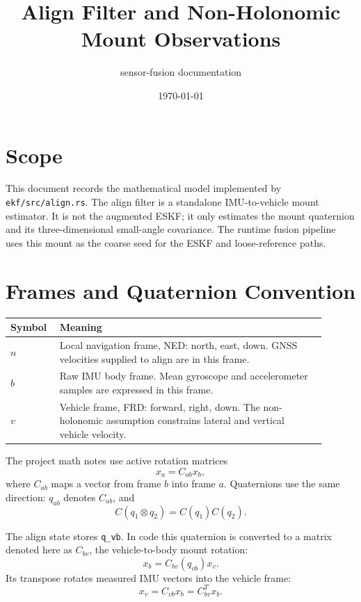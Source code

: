 \documentclass[11pt]{article}
\title{Align Filter and Non-Holonomic Mount Observations}
\author{sensor-fusion documentation}
\date{\today}
\newcommand{\T}{^{T}}
\begin{document}
\maketitle
\tableofcontents
\newpage

\section{Scope}

This document records the mathematical model implemented by
\texttt{ekf/src/align.rs}. The align filter is a standalone IMU-to-vehicle
mount estimator. It is not the augmented ESKF; it only estimates the mount
quaternion and its three-dimensional small-angle covariance. The runtime fusion
pipeline uses this mount as the coarse seed for the ESKF and loose-reference
paths.

\section{Frames and Quaternion Convention}

\begin{longtable}{>{\raggedright\arraybackslash}p{0.12\linewidth} >{\raggedright\arraybackslash}p{0.78\linewidth}}
\toprule
\textbf{Symbol} & \textbf{Meaning} \\
\midrule
\(n\) & Local navigation frame, NED: north, east, down. GNSS velocities supplied to align are in this frame. \\
\(b\) & Raw IMU body frame. Mean gyroscope and accelerometer samples are expressed in this frame. \\
\(v\) & Vehicle frame, FRD: forward, right, down. The non-holonomic assumption constrains lateral and vertical vehicle velocity. \\
\bottomrule
\end{longtable}

The project math notes use active rotation matrices
\begin{equation}
  x_a = C_{ab} x_b ,
\end{equation}
where \(C_{ab}\) maps a vector from frame \(b\) into frame \(a\). Quaternions
use the same direction: \(q_{ab}\) denotes \(C_{ab}\), and
\begin{equation}
  C(q_1 \otimes q_2)=C(q_1)C(q_2).
\end{equation}

The align state stores \texttt{q\_vb}. In code this quaternion is converted to a
matrix denoted here as \(C_{bv}\), the vehicle-to-body mount rotation:
\begin{equation}
  x_b = C_{bv}(q_{vb}) x_v .
\end{equation}
Its transpose rotates measured IMU vectors into the vehicle frame:
\begin{equation}
  x_v = C_{vb} x_b = C_{bv}\T x_b .
\end{equation}
\end{document}
